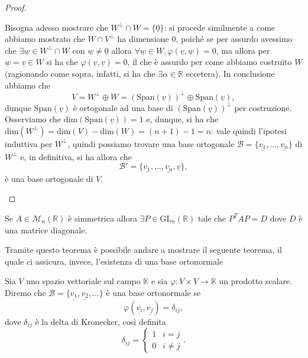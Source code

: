 \begin{proof}
\begin{itemize}
$$		$$
		Bisogna adesso mostrare che $W^\perp \cap W = \{ \underline{0} \}$: si procede similmente a come abbiamo mostrato che $W \cap V^\perp$ ha dimensione $0$, poiché se per assurdo avessimo che $\exists \underline{w} \in W^\perp \cap W$ con $\underline{w} \neq \underline{0}$ allora $\forall \underline{w} \in W, \varphi(\underline{v}, \underline{w}) = 0$, ma allora per $\underline{w}=\underline{v} \in W$ si ha che $\varphi(\underline{v}, \underline{v}) = 0$, il che è assurdo per come abbiamo costruito $W$ (ragionando come sopra, infatti, si ha che $\exists \alpha \in \mathbb{R}$ eccetera).
		In conclusione abbiamo che
		$$
			V = W^\perp \oplus W = (\text{Span}(\underline{v}))^\perp \oplus \text{Span}(\underline{v}),
		$$
		dunque $\text{Span}(\underline{v})$ è ortogonale ad una base di $(\text{Span}(\underline{v}))^\perp$ per costruzione. Osserviamo che $\text{dim}(\text{Span}(\underline{v})) = 1$ e, dunque, si ha che $\text{dim}(W^\perp) = \text{dim}(V) - \text{dim}(W) = (n+1) - 1 = n$: vale quindi l'ipotesi induttiva per $W^\perp$, quindi possiamo trovare una base ortogonale $\mathcal{B} = \{ \underline{v_1}, \ldots, \underline{v_n} \}$ di $W^\perp$ e, in definitiva, si ha allora che
		$$
			\mathcal{B'} = \{ \underline{v_1}, \ldots, \underline{v_n}, \underline{v} \},
		$$
		è una base ortogonale di $V$.
	\end{itemize}
\end{proof}
\begin{cor}
	Se $A \in \mathcal{M}_n(\mathbb{R})$ è simmetrica allora $\exists P \in \text{GL}_n(\mathbb{R})$ tale che $P^T A P = D$ dove $D$ è una matrice diagonale.
\end{cor}

Tramite questo teorema è possibile andare a mostrare il seguente teorema, il quale ci assicura, invece, l'esistenza di una base ortonormale

\begin{definition}
	Sia $V$ uno spazio vettoriale sul campo $\mathbb{K}$ e sia $\varphi:V \times V \to \mathbb{K}$ un prodotto scalare. Diremo che $\mathcal{B} = \{ \underline{v_1}, \underline{v_2}, \ldots \}$ è una base ortonormale se
	$$
		\varphi(\underline{v_i}, \underline{v_j}) = \delta_{ij},
	$$
	dove $\delta_{ij}$ è la delta di Kronecker, così definita
	$$
		\delta_{ij} = \begin{cases}
			1 & i = j \\
			0 & i \neq j
		\end{cases}.
	$$
\end{definition}


